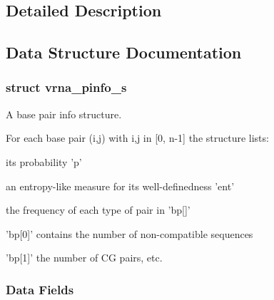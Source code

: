 \subsection{Detailed Description}


\subsection{Data Structure Documentation}
\label{structvrna__pinfo__s}
\hypertarget{group__aln__utils_structvrna__pinfo__s}{}
\subsubsection{struct vrna\-\_\-pinfo\-\_\-s}
A base pair info structure. 

For each base pair (i,j) with i,j in \mbox{[}0, n-\/1\mbox{]} the structure lists\-:
\begin{DoxyItemize}
\item its probability 'p'
\item an entropy-\/like measure for its well-\/definedness 'ent'
\item the frequency of each type of pair in 'bp\mbox{[}\mbox{]}'
\begin{DoxyItemize}
\item 'bp\mbox{[}0\mbox{]}' contains the number of non-\/compatible sequences
\item 'bp\mbox{[}1\mbox{]}' the number of C\-G pairs, etc. 
\end{DoxyItemize}
\end{DoxyItemize}\subsubsection*{Data Fields}
